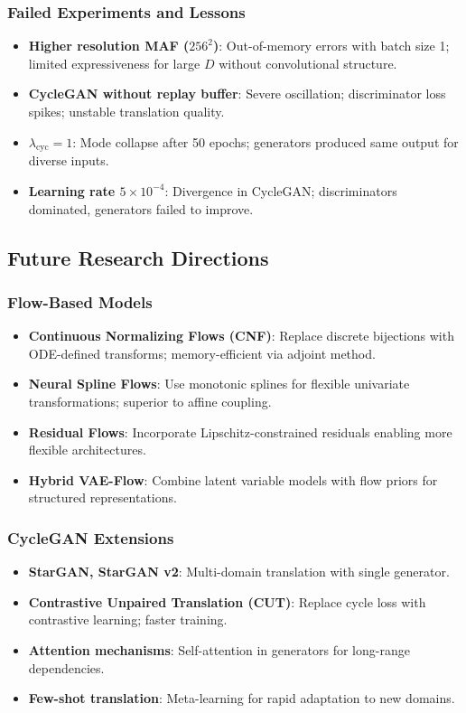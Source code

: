 \documentclass[11pt]{article}
\begin{document}
\subsubsection{Failed Experiments and Lessons}
\begin{itemize}
\item \textbf{Higher resolution MAF ($256^2$)}: Out-of-memory errors with batch size 1; limited expressiveness for large $D$ without convolutional structure.
\item \textbf{CycleGAN without replay buffer}: Severe oscillation; discriminator loss spikes; unstable translation quality.
\item \textbf{$\lambda_{\text{cyc}} = 1$}: Mode collapse after 50 epochs; generators produced same output for diverse inputs.
\item \textbf{Learning rate $5 \times 10^{-4}$}: Divergence in CycleGAN; discriminators dominated, generators failed to improve.
\end{itemize}

\subsection{Future Research Directions}
\subsubsection{Flow-Based Models}
\begin{itemize}
\item \textbf{Continuous Normalizing Flows (CNF)}: Replace discrete bijections with ODE-defined transforms; memory-efficient via adjoint method.
\item \textbf{Neural Spline Flows}: Use monotonic splines for flexible univariate transformations; superior to affine coupling.
\item \textbf{Residual Flows}: Incorporate Lipschitz-constrained residuals enabling more flexible architectures.
\item \textbf{Hybrid VAE-Flow}: Combine latent variable models with flow priors for structured representations.
\end{itemize}

\subsubsection{CycleGAN Extensions}
\begin{itemize}
\item \textbf{StarGAN, StarGAN v2}: Multi-domain translation with single generator.
\item \textbf{Contrastive Unpaired Translation (CUT)}: Replace cycle loss with contrastive learning; faster training.
\item \textbf{Attention mechanisms}: Self-attention in generators for long-range dependencies.
\item \textbf{Few-shot translation}: Meta-learning for rapid adaptation to new domains.
\end{itemize}
\end{document}
